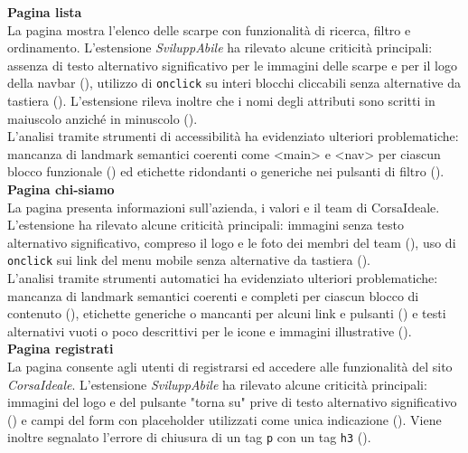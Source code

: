 \noindent \textbf{Pagina lista}\\ 
La pagina mostra l’elenco delle scarpe con funzionalità di ricerca, filtro e ordinamento. 
L’estensione \textit{SviluppAbile} ha rilevato alcune criticità principali: assenza di testo alternativo significativo per le immagini delle scarpe e per il logo della navbar ({}), utilizzo di \texttt{onclick} su interi blocchi cliccabili senza alternative da tastiera ({}). L'estensione rileva inoltre che i nomi degli attributi sono scritti in maiuscolo anziché in minuscolo ({}).\\
L’analisi tramite strumenti di accessibilità ha evidenziato ulteriori problematiche: mancanza di landmark semantici coerenti come <main> e <nav> per ciascun blocco funzionale ({}) ed etichette ridondanti o generiche nei pulsanti di filtro ({}).\\

\noindent \textbf{Pagina chi-siamo}\\
La pagina presenta informazioni sull’azienda, i valori e il team di CorsaIdeale. 
L’estensione ha rilevato alcune criticità principali: immagini senza testo alternativo significativo, compreso il logo e le foto dei membri del team ({}), uso di \texttt{onclick} sui link del menu mobile senza alternative da tastiera ({}).\\
L’analisi tramite strumenti automatici ha evidenziato ulteriori problematiche: mancanza di landmark semantici coerenti e completi per ciascun blocco di contenuto ({}), etichette generiche o mancanti per alcuni link e pulsanti ({}) e testi alternativi vuoti o poco descrittivi per le icone e immagini illustrative ({}).\\

\noindent \textbf{Pagina registrati}\\
La pagina consente agli utenti di registrarsi ed accedere alle funzionalità del sito \textit{CorsaIdeale}. 
L’estensione \textit{SviluppAbile} ha rilevato alcune criticità principali: immagini del logo e del pulsante "torna su" prive di testo alternativo significativo ({}) e campi del form con placeholder utilizzati come unica indicazione ({}). Viene inoltre segnalato l'errore di chiusura di un tag \texttt{p} con un tag \texttt{h3} ({}).\\

